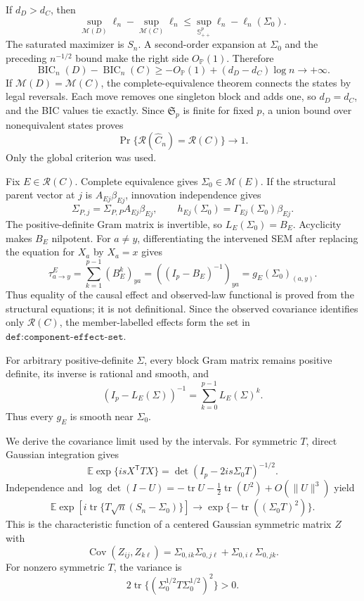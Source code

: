 If \(d_D>d_C\), then
\[
 \sup_{\mathcal M(D)}\ell_n-\sup_{\mathcal M(C)}\ell_n
 \le\sup_{\mathbb S^p_{++}}\ell_n-\ell_n(\Sigma_0).
\]
The saturated maximizer is \(S_n\).  A second-order expansion at \(\Sigma_0\) and the preceding \(n^{-1/2}\) bound make the right side \(O_{\mathbb P}(1)\).  Therefore
\[
 \operatorname{BIC}_n(D)-\operatorname{BIC}_n(C)
 \ge-O_{\mathbb P}(1)+(d_D-d_C)\log n\to+\infty.
\]
If \(\mathcal M(D)=\mathcal M(C)\), the complete-equivalence theorem connects the states by legal reversals.  Each move removes one singleton block and adds one, so \(d_D=d_C\), and the BIC values tie exactly.  Since \(\mathfrak S_p\) is finite for fixed \(p\), a union bound over nonequivalent states proves
\[
 \Pr\{\mathcal R(\widehat C_n)=\mathcal R(C)\}\longrightarrow1.
\]
Only the global criterion was used.

Fix \(E\in\mathcal R(C)\).  Complete equivalence gives \(\Sigma_0\in\mathcal M(E)\).  If the structural parent vector at \(j\) is \(A_{Ej}\beta_{Ej}\), innovation independence gives
\[
 \Sigma_{P,j}=\Sigma_{P,P}A_{Ej}\beta_{Ej},\qquad
 h_{Ej}(\Sigma_0)=\Gamma_{Ej}(\Sigma_0)\beta_{Ej}.
\]
The positive-definite Gram matrix is invertible, so \(L_E(\Sigma_0)=B_E\).  Acyclicity makes \(B_E\) nilpotent.  For \(a\ne y\), differentiating the intervened SEM after replacing the equation for \(X_a\) by \(X_a=x\) gives
\[
 \tau^E_{a\to y}=\sum_{k=1}^{p-1}(B_E^k)_{ya}
 =((I_p-B_E)^{-1})_{ya}=g_E(\Sigma_0)_{(a,y)}.
\]
Thus equality of the causal effect and observed-law functional is proved from the structural equations; it is not definitional.  Since the observed covariance identifies only \(\mathcal R(C)\), the member-labelled effects form the set in \(\texttt{def:component-effect-set}\).

For arbitrary positive-definite \(\Sigma\), every block Gram matrix remains positive definite, its inverse is rational and smooth, and
\[
 (I_p-L_E(\Sigma))^{-1}=\sum_{k=0}^{p-1}L_E(\Sigma)^k.
\]
Thus every \(g_E\) is smooth near \(\Sigma_0\).

We derive the covariance limit used by the intervals.  For symmetric \(T\), direct Gaussian integration gives
\[
 \mathbb E\exp\{isX^{\mathsf T}TX\}
 =\det(I_p-2is\Sigma_0T)^{-1/2}.
\]
Independence and \(\log\det(I-U)=-\operatorname{tr}U-\tfrac12\operatorname{tr}(U^2)+O(\|U\|^3)\) yield
\[
 \mathbb E\exp\!\left[i\operatorname{tr}\{T\sqrt n(S_n-\Sigma_0)\}\right]
 \longrightarrow\exp\{-\operatorname{tr}((\Sigma_0T)^2)\}.
\]
This is the characteristic function of a centered Gaussian symmetric matrix \(Z\) with
\[
 \operatorname{Cov}(Z_{ij},Z_{k\ell})
 =\Sigma_{0,ik}\Sigma_{0,j\ell}+\Sigma_{0,i\ell}\Sigma_{0,jk}.
\]
For nonzero symmetric \(T\), the variance is
\[
 2\operatorname{tr}\{(\Sigma_0^{1/2}T\Sigma_0^{1/2})^2\}>0.
\]

